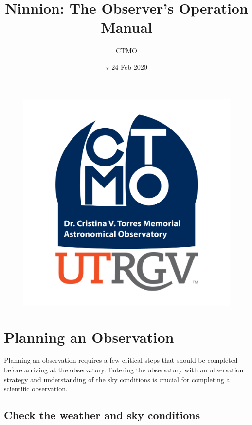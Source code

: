 \documentclass{article}
\title{Ninnion: The Observer's Operation Manual}
\author{CTMO}
\date{v 24 Feb 2020}
\begin{document}
	
	\maketitle
	
	\begin{figure}[b]
		\centering
		\includegraphics[scale=0.2]{CTMO_transparent.png}
	\end{figure}
	
	\newpage
	\tableofcontents
	
	\newpage
	\section{Planning an Observation}
	
		Planning an observation requires a few critical steps that should be completed before arriving at the observatory. Entering the observatory with an observation strategy and understanding of the sky conditions is crucial for completing a scientific observation.
	
		\subsection{Check the weather and sky conditions}
	
\end{document}
